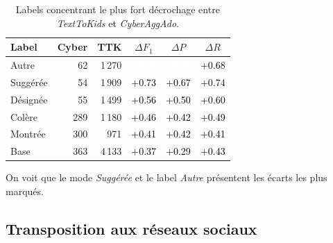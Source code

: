 \begin{table}[htbp]
  \centering
  \small
  \setlength{\tabcolsep}{4pt}
  \begin{tabular}{lrrccc}
    \toprule
    \textbf{Label} & \textbf{Cyber} & \textbf{TTK} & \textbf{$\Delta F_1$} & \textbf{$\Delta P$} & \textbf{$\Delta R$} \\
    \midrule
    Autre & 62 & 1\,270 & \cellcolor[HTML]{E4602C}\textcolor{white}{+0.76} & \cellcolor[HTML]{E25727}\textcolor{white}{+0.78} & \cellcolor[HTML]{E97B39}\textcolor{black}{+0.68} \\
    Suggérée & 54 & 1\,909 & \cellcolor[HTML]{E5682F}\textcolor{black}{+0.73} & \cellcolor[HTML]{E97C3A}\textcolor{black}{+0.67} & \cellcolor[HTML]{E5642D}\textcolor{black}{+0.74} \\
    Désignée & 55 & 1\,499 & \cellcolor[HTML]{EFA24F}\textcolor{black}{+0.56} & \cellcolor[HTML]{F1B55B}\textcolor{black}{+0.50} & \cellcolor[HTML]{ED9447}\textcolor{black}{+0.60} \\
    Colère & 289 & 1\,180 & \cellcolor[HTML]{F0CB66}\textcolor{black}{+0.46} & \cellcolor[HTML]{EEDD6F}\textcolor{black}{+0.42} & \cellcolor[HTML]{F1BA5D}\textcolor{black}{+0.49} \\
    Montrée & 300 & 971 & \cellcolor[HTML]{EEE172}\textcolor{black}{+0.41} & \cellcolor[HTML]{EEDF71}\textcolor{black}{+0.42} & \cellcolor[HTML]{EEE373}\textcolor{black}{+0.41} \\
    Base & 363 & 4\,133 & \cellcolor[HTML]{E4EC7F}\textcolor{black}{+0.37} & \cellcolor[HTML]{CBEA92}\textcolor{black}{+0.29} & \cellcolor[HTML]{EEDC6F}\textcolor{black}{+0.43} \\
    \bottomrule
  \end{tabular}
  \caption{Labels concentrant le plus fort décrochage entre \textit{TextToKids} et \textit{CyberAggAdo}.}
  \label{tab:heatmap-decrochage}
\end{table}

On voit que le mode \textit{Suggérée} et le label \textit{Autre} présentent les écarts les plus marqués.

\FloatBarrier

\subsection*{Transposition aux réseaux sociaux}

